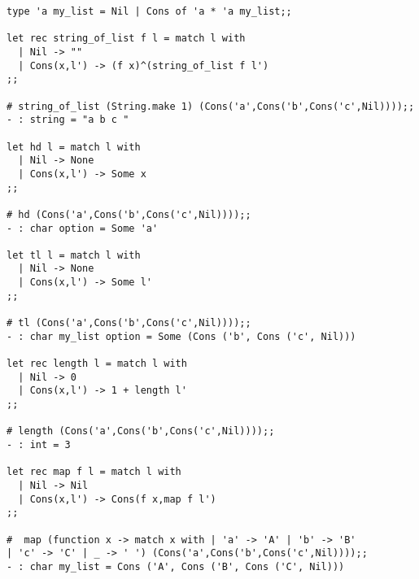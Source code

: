 \documentclass{article}
\begin{document}
\begin{lstlisting}
type 'a my_list = Nil | Cons of 'a * 'a my_list;;

let rec string_of_list f l = match l with
  | Nil -> ""
  | Cons(x,l') -> (f x)^(string_of_list f l')
;;

# string_of_list (String.make 1) (Cons('a',Cons('b',Cons('c',Nil))));;
- : string = "a b c "

let hd l = match l with
  | Nil -> None
  | Cons(x,l') -> Some x
;;

# hd (Cons('a',Cons('b',Cons('c',Nil))));;
- : char option = Some 'a'

let tl l = match l with
  | Nil -> None
  | Cons(x,l') -> Some l'
;;

# tl (Cons('a',Cons('b',Cons('c',Nil))));;
- : char my_list option = Some (Cons ('b', Cons ('c', Nil)))

let rec length l = match l with
  | Nil -> 0
  | Cons(x,l') -> 1 + length l'
;;

# length (Cons('a',Cons('b',Cons('c',Nil))));;
- : int = 3

let rec map f l = match l with
  | Nil -> Nil
  | Cons(x,l') -> Cons(f x,map f l')
;;

#  map (function x -> match x with | 'a' -> 'A' | 'b' -> 'B' 
| 'c' -> 'C' | _ -> ' ') (Cons('a',Cons('b',Cons('c',Nil))));;
- : char my_list = Cons ('A', Cons ('B', Cons ('C', Nil)))

\end{lstlisting}
\end{document}
